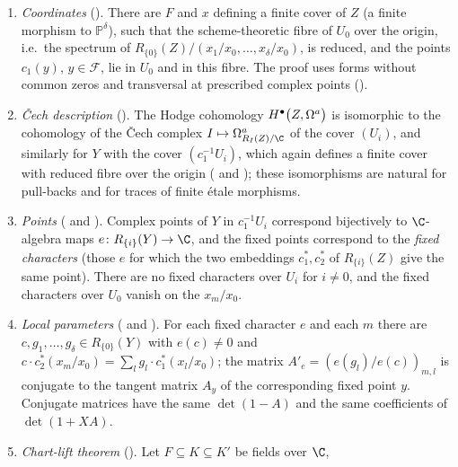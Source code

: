 \begin{enumerate}[label=(\alph*),nosep]
\item \emph{Coordinates} (). There are $F$ and $x$ defining a
  finite cover of $Z$ (a finite morphism to $\mathbb P^\delta$), such that the scheme-theoretic fibre of $U_0$ over the origin, i.e.\ the
  spectrum of $R_{\{0\}}(Z)/(x_1/x_0,\dots,x_\delta/x_0)$, is reduced, and the points $c_1(y)$, $y\in\mathcal F$, lie in $U_0$ and in this fibre.
  The proof uses forms without common zeros and transversal at prescribed complex points
  ().
\item \emph{\v{C}ech description} (). The Hodge cohomology
  $H^{\bullet}\bigl(Z,\Omega^{a}\bigr)$ is isomorphic to the cohomology of the \v{C}ech complex $I\mapsto\Omega^a_{R_I(Z)/\C}$ of the cover $(U_i)$, and similarly
  for $Y$ with the cover $(c_1^{-1}U_i)$, which again defines a finite cover with reduced fibre over the origin
  ( and ); these isomorphisms are
  natural for pull-backs and for traces of finite \'etale morphisms.
\item \emph{Points} ( and ).
  Complex points of $Y$ in $c_1^{-1}U_i$ correspond bijectively to $\C$-algebra maps $e\colon R_{\{i\}}(Y)\to\C$, and the fixed points correspond to
  the \emph{fixed characters} (those $e$ for which the two embeddings $c_1^*,c_2^*$ of $R_{\{i\}}(Z)$ give the same point). There are no fixed
  characters over $U_i$ for $i\ne0$, and the fixed characters over $U_0$ vanish on the $x_m/x_0$.
\item \emph{Local parameters} ( and ).
  For each fixed character $e$ and each $m$ there are $c,g_1,\dots,g_\delta\in R_{\{0\}}(Y)$ with $e(c)\ne0$ and
  $c\cdot c_2^*(x_m/x_0)=\sum_lg_l\cdot c_1^*(x_l/x_0)$; the matrix $A'_e=(e(g_l)/e(c))_{m,l}$ is conjugate to the tangent matrix $A_y$ of the
  corresponding fixed point $y$. Conjugate matrices have the same $\det(1-A)$ and the same coefficients of $\det(1+XA)$.
\item \emph{Chart-lift theorem} (). Let $F\subseteq K\subseteq K'$ be fields over $\C$,

\end{enumerate}

